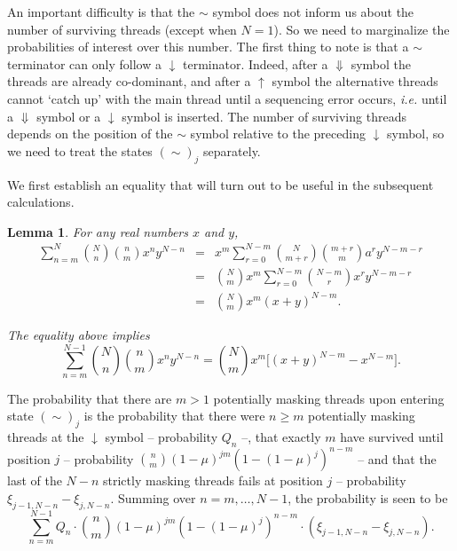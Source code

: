 \documentclass{article}
\newtheorem{lemma}{Lemma}
\begin{document}
An important difficulty is that the $\sim$ symbol does not inform us about
the number of surviving threads (except when $N = 1$). So we need to
marginalize the probabilities of interest over this number. The first
thing to note is that a $\sim$ terminator can only follow a $\downarrow$
terminator. Indeed, after a $\Downarrow$ symbol the threads are already
co-dominant, and after a $\uparrow$ symbol the alternative threads cannot
`catch up' with the main thread until a sequencing error occurs,
\textit{i.e.} until a $\Downarrow$ symbol or a $\downarrow$ symbol is
inserted. The number of surviving threads depends on the position of the
$\sim$ symbol relative to the preceding $\downarrow$ symbol, so we need
to treat the states $(\sim)_j$ separately.

We first establish an equality that will turn out to be useful in the
subsequent calculations.

\begin{lemma}
For any real numbers $x$ and $y$,
\begin{eqnarray*}
\sum_{n=m}^N {N \choose n} {n \choose m} x^n y^{N-n}
&=& x^m \sum_{r=0}^{N-m} {N \choose m+r} {m+r \choose m}a^r y^{N-m-r} \\
&=& {N \choose m} x^m \sum_{r=0}^{N-m} {N-m \choose r}x^r y^{N-m-r} \\
&=& {N \choose m} x^m (x+y)^{N-m}.
\end{eqnarray*}

The equality above implies
\begin{equation}
\label{eq:double_binom}
\sum_{n=m}^{N-1} {N \choose n} {n \choose m} x^n y^{N-n} =
{N \choose m} x^m \Big[ (x+y)^{N-m} - x^{N-m} \Big].
\end{equation}
\end{lemma}

The probability that there are $m>1$ potentially masking threads upon
entering state $(\sim)_j$ is the probability that there were $n \geq m$
potentially masking threads at the $\downarrow$ symbol -- probability
$Q_n$ --, that exactly $m$ have survived until position $j$ -- probability
${n \choose m} (1-\mu)^{jm} (1-(1-\mu)^j)^{n-m}$ -- and that the last of
the $N-n$ strictly masking threads fails at position $j$ -- probability
$\xi_{j-1,N-n}-\xi_{j,N-n}$. Summing over $n = m, \ldots, N-1$, the
probability is seen to be
\begin{equation}
\label{eq:miscprob}
\sum_{n=m}^{N-1} Q_n \cdot {n \choose m} (1-\mu)^{jm} (1-(1-\mu)^j)^{n-m}
\cdot (\xi_{j-1,N-n}-\xi_{j,N-n}).
\end{equation}
\end{document}
